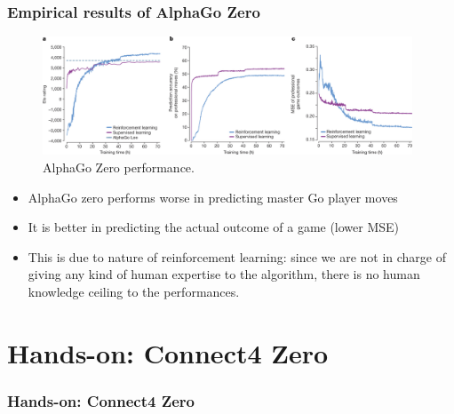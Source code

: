\documentclass[9pt]{beamer}
\begin{document}
\begin{frame}
	\frametitle{Empirical results of AlphaGo Zero}
	
	\begin{figure}[H]
		\centering
		\includegraphics[width=11cm,trim={0px 0px 0px 45px},clip]{alpha-go-zero_empirical_results.png}
		\caption{AlphaGo Zero performance. \cite{Silver_2016}}
	\end{figure}

	\begin{itemize}
		\item AlphaGo zero performs worse in predicting master Go player moves
		\item It is better in predicting the actual outcome of a game (lower MSE)
		\item This is due to nature of reinforcement learning: since we are not in charge of giving any kind of human expertise to the algorithm, there is no human knowledge ceiling to the performances.
	\end{itemize}

\end{frame}


\section{Hands-on: Connect4 Zero}

\begin{frame}
	\frametitle{Hands-on: Connect4 Zero}
	
	\tableofcontents[ 
	currentsubsection, 
	hideothersubsections, 
	sectionstyle=show/shaded,
	]
	
\end{frame}
\end{document}
